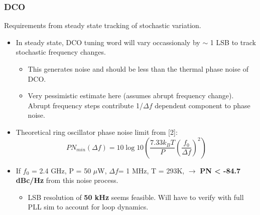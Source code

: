 \documentclass[t, screen, aspectratio=43]{beamer}
\begin{document}
\begin{frame}
	\frametitle{DCO}
	\begin{block}{Requirements from steady state tracking of stochastic variation.}
		\begin{minipage}{7cm}
			\vspace{1em}
			\begin{itemize}
				\scriptsize
				\item In steady state, DCO tuning word will vary occassionaly by $\sim$ 1 LSB to track stochastic frequency changes.
				\begin{itemize}
					\tiny
					\item This generates noise and should be less than the thermal phase noise of DCO.		
					\item Very pessimistic estimate here (assumes abrupt frequency change). Abrupt frequency steps contribute 1/$\Delta f$ dependent component to phase noise.
				\end{itemize} 
				\item Theoretical ring oscillator phase noise limit from [2]:
				\tiny
				\begin{equation}
					PN_{min}(\Delta f)= 10\log 10\left(\frac{7.33k_BT}{P}\left(\frac{f_0}{\Delta f}\right)^2\right)
				\end{equation}
				\scriptsize
				\item If $f_0$ = 2.4 GHz, P = 50 $\mu$W, $\Delta f$= 1 MHz, T = 293K, $\rightarrow$ \textbf{PN < -84.7 dBc/Hz} from this noise process.
				\begin{itemize}
					\scriptsize			
					\item LSB resolution of \textbf{50 kHz} seems feasible. Will have to verify with full PLL sim to account for loop dynamics.
				\end{itemize} 
			\end{itemize}  
		\end{minipage}%
		\begin{minipage}{5cm}

\end{minipage}
\end{block}
\end{frame}
\end{document}
